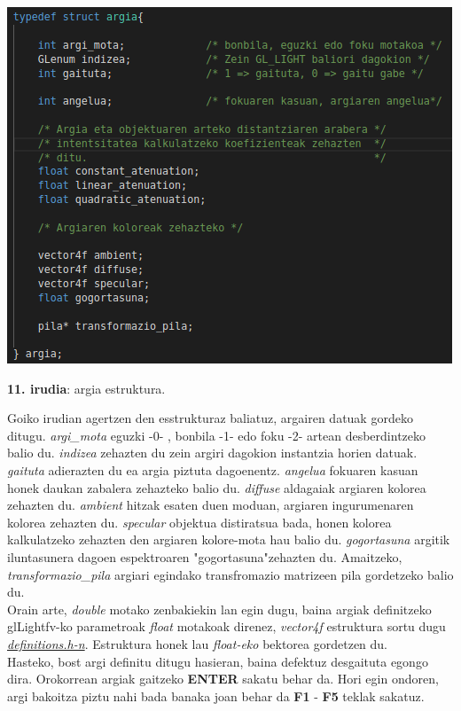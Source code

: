 \documentclass[12pt]{article}
\newcommand{\fitxategi}[1] {\underline{\textit{#1}}}
\newcommand{\aldagai}[1] {\textit{#1}}
\newcommand{\tekla}[1] {\textbf{#1}}
\begin{document}
\begin{center}
\includegraphics[scale=2]{argia_estruktura.png}

\textbf{11. irudia}: argia estruktura.
\end{center}

Goiko irudian agertzen den esstrukturaz baliatuz, argairen datuak gordeko ditugu. \aldagai{argi\_mota} eguzki -0- , bonbila -1- edo foku -2- artean desberdintzeko balio du. \aldagai{indizea} zehazten du zein argiri dagokion instantzia horien datuak. \aldagai{gaituta} adierazten du ea argia piztuta dagoenentz. \aldagai{angelua} fokuaren kasuan honek daukan zabalera zehazteko balio du. \aldagai{diffuse} aldagaiak argiaren kolorea zehazten du. \aldagai{ambient} hitzak esaten duen moduan, argiaren ingurumenaren kolorea zehazten du. \aldagai{specular} objektua distiratsua bada, honen kolorea kalkulatzeko zehazten den argiaren kolore-mota hau balio du. \aldagai{gogortasuna} argitik iluntasunera dagoen espektroaren "gogortasuna"zehazten du. Amaitzeko, \aldagai{transformazio\_pila} argiari egindako transfromazio matrizeen pila gordetzeko balio du.\\

Orain arte, \aldagai{double} motako zenbakiekin lan egin dugu, baina argiak definitzeko glLightfv-ko parametroak \aldagai{float} motakoak direnez, \aldagai{vector4f} estruktura sortu dugu \fitxategi{definitions.h-n}. Estruktura honek lau \aldagai{float-eko} bektorea gordetzen du.\\

Hasteko, bost argi definitu ditugu hasieran, baina defektuz desgaituta egongo dira. Orokorrean argiak gaitzeko \tekla{ENTER} sakatu behar da. Hori egin ondoren, argi bakoitza piztu nahi bada banaka joan behar da \tekla{F1} - \tekla{F5} teklak sakatuz.\\
\end{document}
